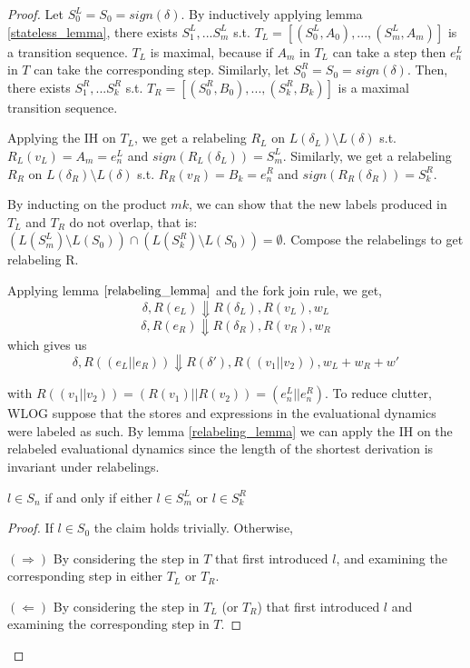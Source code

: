 \begin{proof}
Let $S^L_0 = S_0 = sign(\delta)$. By inductively applying lemma \ref{stateless_lemma}, there exists $S^L_1, ... S^L_m$ s.t. $T_L = [(S^L_0, A_0), ..., (S^L_m, A_m)]$ is a transition sequence. $T_L$ is maximal, because if $A_m$ in $T_L$ can take a step then $e^L_n$ in $T$ can take the corresponding step. Similarly, let  $S^R_0 = S_0 = sign(\delta)$. Then, there exists $S^R_1, ... S^R_k$ s.t. $T_R = [(S^R_0, B_0), ..., (S^R_k, B_k)]$ is a maximal transition sequence.

Applying the IH on $T_L$, we get a relabeling $R_L$ on $L(\delta_L) \setminus L(\delta)$ s.t. $R_L(v_L) = A_m = e^L_n$ and $sign(R_L(\delta_L)) = S^L_m$. Similarly, we get a relabeling $R_R$ on $L(\delta_R) \setminus L(\delta)$ s.t. $R_R(v_R) = B_k = e^R_n$ and $sign(R_R(\delta_R)) = S^R_k$. 

By inducting on the product $mk$, we can show that the new labels produced in $T_L$ and $T_R$ do not overlap, that is: $(L(S^L_m) \setminus L(S_0)) \cap (L(S^R_k) \setminus L(S_0)) = \emptyset$. Compose the relabelings to get relabeling R.

Applying lemma $\ref{relabeling_lemma}$ and the fork join rule, we get,
$$\delta, R(e_L) \Downarrow R(\delta_L), R(v_L), w_L$$
$$\delta, R(e_R) \Downarrow R(\delta_R), R(v_R), w_R$$
which gives us
$$\delta, R((e_L || e_R)) \Downarrow R(\delta'), R((v_1 || v_2)), w_L + w_R + w'$$

with $R((v_1||v_2)) = (R(v_1) || R(v_2)) = (e_n^L || e_n^R)$. To reduce clutter, WLOG suppose that the stores and expressions in the evaluational dynamics were labeled as such. By lemma \ref{relabeling_lemma} we can apply the IH on the relabeled evaluational dynamics since the length of the shortest derivation is invariant under relabelings.

\begin{lemma}
\label{label_projection_lemma}
$l \in S_n$ if and only if either $l \in S^L_m$ or $l \in S^R_k$
\end{lemma}

\begin{proof}
If $l \in S_0$ the claim holds trivially. Otherwise,

$(\Rightarrow)$ By considering the step in $T$ that first introduced $l$, and examining the corresponding step in either $T_L$ or $T_R$.

$(\Leftarrow)$ By considering the step in $T_L$ (or $T_R$) that first introduced $l$ and examining the corresponding step in $T$.
\end{proof}


\end{proof}
